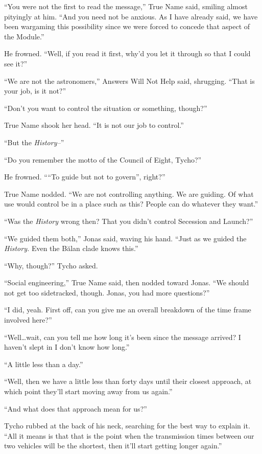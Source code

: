 ``You were not the first to read the message,'' True Name said, smiling almost pityingly at him. ``And you need not be anxious. As I have already said, we have been wargaming this possibility since we were forced to concede that aspect of the Module.''

He frowned. ``Well, if you read it first, why'd you let it through so that I could see it?''

``We are not the astronomers,'' Answers Will Not Help said, shrugging. ``That is your job, is it not?''

``Don't you want to control the situation or something, though?''

True Name shook her head. ``It is not our job to control.''

``But the \emph{History--}''

``Do you remember the motto of the Council of Eight, Tycho?''

He frowned. ````To guide but not to govern'', right?''

True Name nodded. ``We are not controlling anything. We are guiding. Of what use would control be in a place such as this? People can do whatever they want.''

``Was the \emph{History} wrong then? That you didn't control Secession and Launch?''

``We guided them both,'' Jonas said, waving his hand. ``Just as we guided the \emph{History.} Even the Bălan clade knows this.''

``Why, though?'' Tycho asked.

``Social engineering,'' True Name said, then nodded toward Jonas. ``We should not get too sidetracked, though. Jonas, you had more questions?''

``I did, yeah. First off, can you give me an overall breakdown of the time frame involved here?''

``Well\ldots wait, can you tell me how long it's been since the message arrived? I haven't slept in I don't know how long.''

``A little less than a day.''

``Well, then we have a little less than forty days until their closest approach, at which point they'll start moving away from us again.''

``And what does that approach mean for us?''

Tycho rubbed at the back of his neck, searching for the best way to explain it. ``All it means is that that is the point when the transmission times between our two vehicles will be the shortest, then it'll start getting longer again.''

